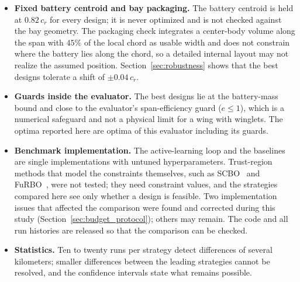 \begin{itemize}
    \item \textbf{Fixed battery centroid and bay packaging.} The battery centroid is held at $0.82\,c_{r}$ for every design; it is never optimized and is not checked against the bay geometry. The packaging check integrates a center-body volume along the span with $45\%$ of the local chord as usable width and does not constrain where the battery lies along the chord, so a detailed internal layout may not realize the assumed position. Section~\ref{sec:robustness} shows that the best designs tolerate a shift of $\pm 0.04\,c_r$.
    \item \textbf{Guards inside the evaluator.} The best designs lie at the battery-mass bound and close to the evaluator's span-efficiency guard ($e \le 1$), which is a numerical safeguard and not a physical limit for a wing with winglets. The optima reported here are optima of this evaluator including its guards.
    \item \textbf{Benchmark implementation.} The active-learning loop and the baselines are single implementations with untuned hyperparameters. Trust-region methods that model the constraints themselves, such as SCBO~\cite{eriksson2021scbo} and FuRBO~\cite{ascia2025furbo}, were not tested; they need constraint values, and the strategies compared here see only whether a design is feasible. Two implementation issues that affected the comparison were found and corrected during this study (Section~\ref{sec:budget_protocol}); others may remain. The code and all run histories are released so that the comparison can be checked.
    \item \textbf{Statistics.} Ten to twenty runs per strategy detect differences of several kilometers; smaller differences between the leading strategies cannot be resolved, and the confidence intervals state what remains possible.
\end{itemize}
